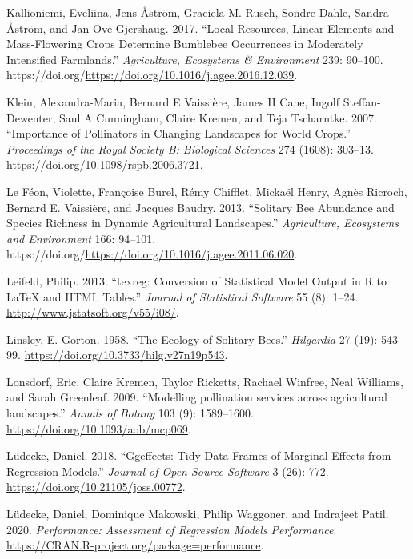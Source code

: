 \documentclass[smallextended]{svjour3}       %
\newlength{\cslhangindent}
\newenvironment{CSLReferences}[2] %
 {%
  \setlength{\parindent}{0pt}
  \ifodd #1 \everypar{\setlength{\hangindent}{\cslhangindent}}\ignorespaces\fi
  \ifnum #2 > 0
  \setlength{\parskip}{#2\baselineskip}
  \fi
 }%
 {}
\begin{document}
\begin{CSLReferences}{1}{0}
\leavevmode{}%
Kallioniemi, Eveliina, Jens Åström, Graciela M. Rusch, Sondre Dahle,
Sandra Åström, and Jan Ove Gjershaug. 2017. {``Local Resources, Linear
Elements and Mass-Flowering Crops Determine Bumblebee Occurrences in
Moderately Intensified Farmlands.''} \emph{Agriculture, Ecosystems \&
Environment} 239: 90--100.
https://doi.org/\url{https://doi.org/10.1016/j.agee.2016.12.039}.

\leavevmode{}%
Klein, Alexandra-Maria, Bernard E Vaissière, James H Cane, Ingolf
Steffan-Dewenter, Saul A Cunningham, Claire Kremen, and Teja Tscharntke.
2007. {``Importance of Pollinators in Changing Landscapes for World
Crops.''} \emph{Proceedings of the Royal Society B: Biological Sciences}
274 (1608): 303--13. \url{https://doi.org/10.1098/rspb.2006.3721}.

\leavevmode{}%
Le Féon, Violette, Françoise Burel, Rémy Chifflet, Mickaël Henry, Agnès
Ricroch, Bernard E. Vaissière, and Jacques Baudry. 2013. {``Solitary Bee
Abundance and Species Richness in Dynamic Agricultural Landscapes.''}
\emph{Agriculture, Ecosystems and Environment} 166: 94--101.
https://doi.org/\url{https://doi.org/10.1016/j.agee.2011.06.020}.

\leavevmode{}%
Leifeld, Philip. 2013. {``{texreg}: Conversion of Statistical Model
Output in {R} to {LaTeX} and {HTML} Tables.''} \emph{Journal of
Statistical Software} 55 (8): 1--24.
\url{http://www.jstatsoft.org/v55/i08/}.

\leavevmode{}%
Linsley, E. Gorton. 1958. {``The Ecology of Solitary Bees.''}
\emph{Hilgardia} 27 (19): 543--99.
\url{https://doi.org/10.3733/hilg.v27n19p543}.

\leavevmode{}%
Lonsdorf, Eric, Claire Kremen, Taylor Ricketts, Rachael Winfree, Neal
Williams, and Sarah Greenleaf. 2009. {``{Modelling pollination services
across agricultural landscapes}.''} \emph{Annals of Botany} 103 (9):
1589--1600. \url{https://doi.org/10.1093/aob/mcp069}.

\leavevmode{}%
Lüdecke, Daniel. 2018. {``Ggeffects: Tidy Data Frames of Marginal
Effects from Regression Models.''} \emph{Journal of Open Source
Software} 3 (26): 772. \url{https://doi.org/10.21105/joss.00772}.

\leavevmode{}%
Lüdecke, Daniel, Dominique Makowski, Philip Waggoner, and Indrajeet
Patil. 2020. \emph{Performance: Assessment of Regression Models
Performance}. \url{https://CRAN.R-project.org/package=performance}.


\end{CSLReferences}
\end{document}
